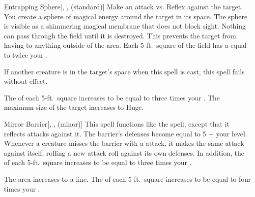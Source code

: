 \lowercase{\hypertarget{spell:Entrapping Sphere}{}}\label{spell:Entrapping Sphere}
\begin{freeability}[Rank 4]{\hypertarget{spell:Entrapping Sphere}{Entrapping Sphere}}[, ,  (standard)]
Make an attack vs. Reflex against the target.
\hit You create a sphere of magical energy around the target in its space.
The sphere is visible as a shimmering magical membrane that does not block sight.
Nothing can pass through the field until it is destroyed.
This prevents the target from having  to anything outside of the area.
Each 5-ft.\ square of the field has a  equal to twice your .

If another creature is in the target's space when this spell is cast, this spell fails without effect.

\rankline
{} The  of each 5-ft.\ square increases to be equal to three times your .
 The maximum size of the target increases to Huge.

\end{freeability}
\vspace{0.25em}



\lowercase{\hypertarget{spell:Mirror Barrier}{}}\label{spell:Mirror Barrier}
\begin{freeability}[Rank 4]{\hypertarget{spell:Mirror Barrier}{Mirror Barrier}}[, ,  (minor)]
\targetrule
This spell functions like the  spell, except that it reflects  attacks against it.
The barrier's defenses become equal to 5 + your level.
Whenever a creature misses the barrier with a  attack, it makes the same attack against itself, rolling a new attack roll against its own defenses.
In addition, the  of each 5-ft.\ square increases to be equal to three times your .

\rankline
{} The area increases to a \arealarge line.
 The  of each 5-ft.\ square increases to be equal to four times your .

\end{freeability}
\vspace{0.25em}



